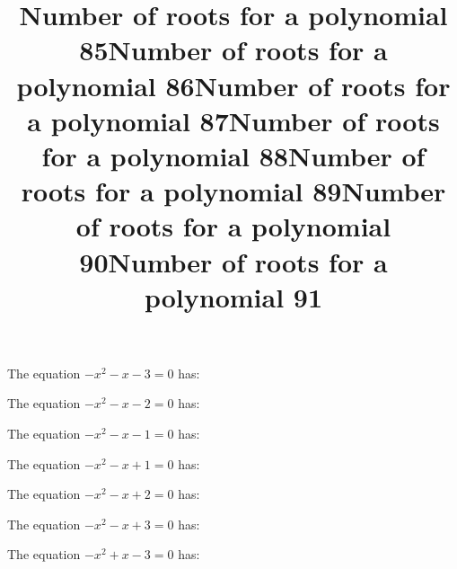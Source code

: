 \documentclass{article}
\begin{document}
\begin{category}
\begin{question}[multichoice]
\end{question}
\begin{question}[multichoice]
\title{Number of roots for a polynomial 85}
The equation $- x^{2} - x - 3=0$ has:


\end{question}
\begin{question}[multichoice]
\title{Number of roots for a polynomial 86}
The equation $- x^{2} - x - 2=0$ has:


\end{question}
\begin{question}[multichoice]
\title{Number of roots for a polynomial 87}
The equation $- x^{2} - x - 1=0$ has:


\end{question}
\begin{question}[multichoice]
\title{Number of roots for a polynomial 88}
The equation $- x^{2} - x + 1=0$ has:


\end{question}
\begin{question}[multichoice]
\title{Number of roots for a polynomial 89}
The equation $- x^{2} - x + 2=0$ has:


\end{question}
\begin{question}[multichoice]
\title{Number of roots for a polynomial 90}
The equation $- x^{2} - x + 3=0$ has:


\end{question}
\begin{question}[multichoice]
\title{Number of roots for a polynomial 91}
The equation $- x^{2} + x - 3=0$ has:


\end{question}
\end{category}
\end{document}
